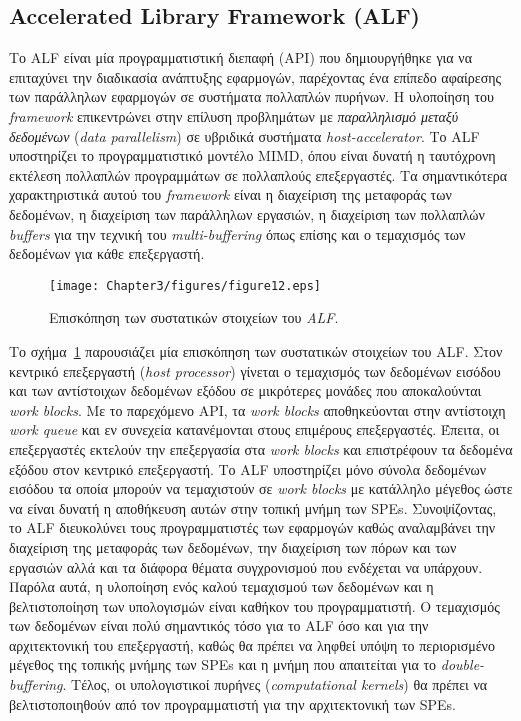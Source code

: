 \subsection[3.3.4 Accelerated Library Framework (ALF)]{Accelerated Library Framework (ALF)}
\label{subsection:sub334}
\indent
Το \ac{ALF} είναι μία προγραμματιστική διεπαφή (\ac{API}) που δημιουργήθηκε για να επιταχύνει την διαδικασία ανάπτυξης εφαρμογών, παρέχοντας ένα επίπεδο αφαίρεσης των παράλληλων εφαρμογών σε συστήματα πολλαπλών πυρήνων. Η υλοποίηση του \textsl{framework} επικεντρώνει στην επίλυση προβλημάτων με \textsl{παραλληλισμό μεταξύ δεδομένων} (\textsl{data parallelism}) σε υβριδικά συστήματα \textsl{host-accelerator}. Το \ac{ALF} υποστηρίζει το προγραμματιστικό μοντέλο \ac{MIMD}, όπου είναι δυνατή η ταυτόχρονη εκτέλεση πολλαπλών προγραμμάτων σε πολλαπλούς επεξεργαστές. Τα σημαντικότερα χαρακτηριστικά αυτού του \textsl{framework} είναι η διαχείριση της μεταφοράς των δεδομένων, η διαχείριση των παράλληλων εργασιών, η διαχείριση των πολλαπλών \textsl{buffers} για την τεχνική του \textsl{multi-buffering} όπως επίσης και ο τεμαχισμός των δεδομένων για κάθε επεξεργαστή.

\begin{figure}
\centering
\texttt{[image: Chapter3/figures/figure12.eps]}
\caption{Επισκόπηση των συστατικών στοιχείων του \textsl{ALF}.}
\label{figure:fig312}
\end{figure}

\indent
Το σχήμα~\ref{figure:fig312} παρουσιάζει μία επισκόπηση των συστατικών στοιχείων του \ac{ALF}. Στον κεντρικό επεξεργαστή (\textsl{host processor}) γίνεται ο τεμαχισμός των δεδομένων εισόδου και των αντίστοιχων δεδομένων εξόδου σε μικρότερες μονάδες που αποκαλούνται \textsl{work blocks}. Με το παρεχόμενο \ac{API}, τα \textsl{work blocks} αποθηκεύονται στην αντίστοιχη \textsl{work queue} και εν συνεχεία κατανέμονται στους επιμέρους επεξεργαστές. Έπειτα, οι επεξεργαστές εκτελούν την επεξεργασία στα \textsl{work blocks} και επιστρέφουν τα δεδομένα εξόδου στον κεντρικό επεξεργαστή. Το \ac{ALF} υποστηρίζει μόνο σύνολα δεδομένων εισόδου τα οποία μπορούν να τεμαχιστούν σε \textsl{work blocks} με κατάλληλο μέγεθος ώστε να είναι δυνατή η αποθήκευση αυτών στην τοπική μνήμη των \acp{SPE}.\newline \indent
Συνοψίζοντας, το \ac{ALF} διευκολύνει τους προγραμματιστές των εφαρμογών καθώς αναλαμβάνει την διαχείριση της μεταφοράς των δεδομένων, την διαχείριση των πόρων και των εργασιών αλλά και τα διάφορα θέματα συγχρονισμού που ενδέχεται να υπάρχουν. Παρόλα αυτά, η υλοποίηση ενός καλού τεμαχισμού των δεδομένων και η βελτιστοποίηση των υπολογισμών είναι καθήκον του προγραμματιστή. Ο τεμαχισμός των δεδομένων είναι πολύ σημαντικός τόσο για το \ac{ALF} όσο και για την αρχιτεκτονική του επεξεργαστή, καθώς θα πρέπει να ληφθεί υπόψη το περιορισμένο μέγεθος της τοπικής μνήμης των \acp{SPE} και η μνήμη που απαιτείται για το \textsl{double-buffering}. Τέλος, οι υπολογιστικοί πυρήνες (\textsl{computational kernels}) θα πρέπει να βελτιστοποιηθούν από τον προγραμματιστή για την αρχιτεκτονική των \acp{SPE}.








